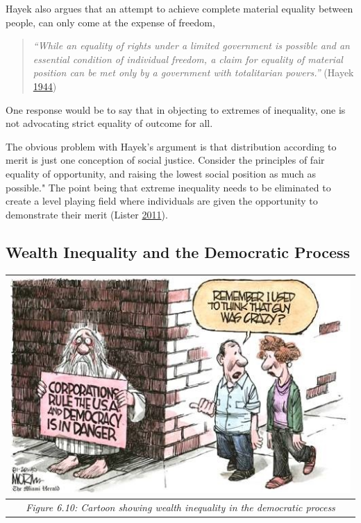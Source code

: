 \documentclass[]{tufte-handout}
\begin{document}
Hayek also argues that an attempt to achieve complete material equality
between people, can only come at the expense of freedom,

\begin{quote}
\emph{``While an equality of rights under a limited government is
possible and an essential condition of individual freedom, a claim for
equality of material position can be met only by a government with
totalitarian powers.''} (Hayek \protect\hyperlink{ref-Hayek1944}{1944})
\end{quote}

One response would be to say that in objecting to extremes of
inequality, one is not advocating strict equality of outcome for all.

The obvious problem with Hayek's argument is that distribution according
to merit is just one conception of social justice. Consider the
principles of fair equality of opportunity, and raising the lowest
social position as much as possible." The point being that extreme
inequality needs to be eliminated to create a level playing field where
individuals are given the opportunity to demonstrate their merit (Lister
\protect\hyperlink{ref-Lister2011}{2011}).

\hypertarget{wealth-inequality-and-the-democratic-process}{%
\subsection{Wealth Inequality and the Democratic
Process}\label{wealth-inequality-and-the-democratic-process}}

\begin{longtable}[]{@{}c@{}}
\toprule
\includegraphics{ChapterPictures/6-9-WealthIneqDemocracy.jpg}\tabularnewline
\midrule
\endhead
\emph{Figure 6.10: Cartoon showing wealth inequality in the democratic
process}\tabularnewline
\bottomrule
\end{longtable}
\end{document}
